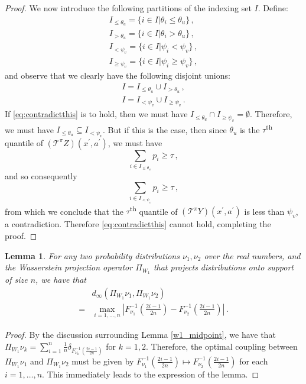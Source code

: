 \documentclass[letterpaper]{article}
\newtheorem{lem}{Lemma}
\begin{document}
\begin{proof}
We now introduce the following partitions of the indexing set $I$. Define:
\begin{align*}
I_{\leq \theta_u} = \{ i \in I | \theta_i \leq \theta_u \} \, ,\\
I_{> \theta_u} = \{ i \in I | \theta_i > \theta_u \} \, , \\
I_{< \psi_v} = \{ i \in I | \psi_i < \psi_v \} \, , \\
I_{\geq \psi_v} = \{ i \in I | \psi_i \geq \psi_v \} \, ,
\end{align*}
and observe that we clearly have the following disjoint unions:
\begin{align*}
I = I_{\leq \theta_u} \cup I_{> \theta_u} \, , \\
I = I_{< \psi_v} \cup  I_{\geq \psi_v} \, .
\end{align*}
If \eqref{eq:contradictthis} is to hold, then we must have $I_{\leq \theta_u} \cap I_{\geq \psi_v}  = \emptyset$. Therefore, we must have $I_{\leq \theta_u} \subseteq I_{< \psi_v}$. But if this is the case, then since $\theta_u$ is the $\tau$\textsuperscript{th} quantile of $(\mathcal{T}^\pi Z)(x^\prime, a^\prime)$, we must have
\[
\sum_{i \in I_{\leq \theta_u}} p_i \geq \tau \, ,
\]
and so consequently
\[
\sum_{i \in I_{< \psi_v}} p_i \geq \tau \, ,
\]
from which we conclude that the $\tau$\textsuperscript{th} quantile of $(\mathcal{T}^\pi Y)(x^\prime, a^\prime)$ is less than $\psi_v$, a contradiction. Therefore \eqref{eq:contradictthis} cannot hold, completing the proof.
\end{proof}

\begin{lem}\label{lem:WinftyIsMaxQuantileDiff}
For any two probability distributions $\nu_1, \nu_2$ over the real numbers, and the Wasserstein projection operator $\Pi_{W_1}$ that projects distributions onto support of size $n$, we have that
\begin{align*}
& d_\infty(\Pi_{W_1} \nu_1, \Pi_{W_1} \nu_2) \\
= & \max_{i=1,\ldots,n} \left|F_{\nu_1}^{-1}\left(\frac{2i-1}{2n}\right) - F_{\nu_2}^{-1}\left(\frac{2i-1}{2n}\right)\right| \, .
\end{align*}
\end{lem}
\begin{proof}
By the discussion surrounding Lemma \ref{w1_midpoint}, we have that $\Pi_{W_1} \nu_k = \sum_{i=1}^n \frac{1}{n} \delta_{F^{-1}_{\nu_k}(\frac{2i-1}{2n})}$ for $k=1,2$. Therefore, the optimal coupling between $\Pi_{W_1} \nu_1$ and $\Pi_{W_1} \nu_2$ must be given by $F^{-1}_{\nu_1}(\frac{2i-1}{2n}) \mapsto F^{-1}_{\nu_2}(\frac{2i-1}{2n})$ for each $i=1,\ldots, n$. This immediately leads to the expression of the lemma.
\end{proof}
\end{document}
